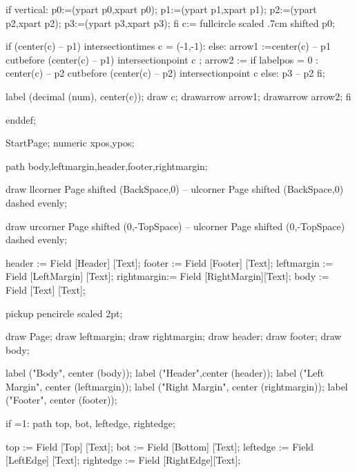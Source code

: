     if vertical:
       p0:=(ypart p0,xpart p0);
       p1:=(ypart p1,xpart p1);
       p2:=(ypart p2,xpart p2);
       p3:=(ypart p3,xpart p3);
    fi
    c:= fullcircle scaled .7cm shifted p0;
    
    if (center(c) -- p1) intersectiontimes c = (-1,-1):
    else:
        arrow1 :=center(c) -- p1 cutbefore (center(c) -- p1) intersectionpoint c ;
        arrow2 :=  
           if labelpos = 0 : %
                 center(c) -- p2 cutbefore (center(c) -- p2) intersectionpoint c 
           else: 
                 p3 -- p2
           fi;
      
        label (decimal (num), center(c));
        draw c;
        drawarrow arrow1;
        drawarrow arrow2;
    fi
    
enddef;



StartPage;
numeric xpos,ypos;

path body,leftmargin,header,footer,rightmargin;


draw llcorner Page shifted (BackSpace,0) --
      ulcorner Page shifted (BackSpace,0) dashed evenly;

draw urcorner Page shifted (0,-TopSpace) --
      ulcorner Page shifted (0,-TopSpace) dashed evenly;


header     := Field [Header]     [Text];
footer     := Field [Footer]     [Text];
leftmargin := Field [LeftMargin] [Text];
rightmargin:= Field [RightMargin][Text];
body       := Field [Text]       [Text];

pickup pencircle scaled 2pt;

draw Page;
draw leftmargin;
draw rightmargin;
draw header;
draw footer;
draw body;



label ("Body", center (body));
label ("Header",center (header));
label ("Left Margin", center (leftmargin));
label ("Right Margin", center (rightmargin));
label ("Footer", center (footer));


if =1:
   path top, bot, leftedge, rightedge;

   top       := Field [Top]      [Text];
   bot       := Field [Bottom]   [Text];
   leftedge  := Field [LeftEdge] [Text];
   rightedge := Field [RightEdge][Text];

